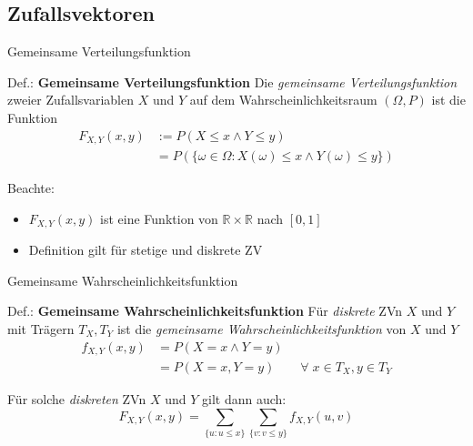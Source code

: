 \documentclass[
  10pt,
  ignorenonframetext,
]{beamer}
\providecommand{\tightlist}{%
  \setlength{\itemsep}{0pt}\setlength{\parskip}{0pt}}
\begin{document}
\subsection{Zufallsvektoren}\label{zufallsvektoren}

\begin{frame}{Gemeinsame Verteilungsfunktion}
\label{gemeinsame-verteilungsfunktion}
\begin{block}{Def.: \textbf{Gemeinsame Verteilungsfunktion}}
\label{def.-gemeinsame-verteilungsfunktion}
Die \emph{gemeinsame Verteilungsfunktion} zweier Zufallsvariablen \(X\)
und \(Y\) auf dem Wahrscheinlichkeitsraum \((\Omega, P)\) ist die
Funktion \begin{align*}
F_{X,Y}(x,y) &:=  P(X \leq x \land Y \leq y) \\
      &\phantom{}= P(\{\omega \in \Omega: X(\omega) \leq x \land Y(\omega) \leq y\})
\end{align*}
\end{block}

Beachte:

\begin{itemize}
\tightlist
\item
  \(F_{X,Y}(x, y)\) ist eine Funktion von
  \(\mathbb{R} \times \mathbb{R}\) nach \([0, 1]\)
\item
  Definition gilt für stetige und diskrete ZV
\end{itemize}
\end{frame}

\begin{frame}{Gemeinsame Wahrscheinlichkeitsfunktion}
\label{gemeinsame-wahrscheinlichkeitsfunktion}
\begin{block}{Def.: \textbf{Gemeinsame Wahrscheinlichkeitsfunktion}}
\label{def.-gemeinsame-wahrscheinlichkeitsfunktion}
Für \emph{diskrete} ZVn \(X\) und \(Y\) mit Trägern \(T_X,  T_Y\) ist
die \emph{gemeinsame Wahrscheinlichkeitsfunktion} von \(X\) und \(Y\)
\begin{align*}
f_{X,Y}(x,y) &= P(X = x \land Y = y) \\
             &= P(X = x, Y = y) \qquad \forall\; x \in T_X, y \in T_Y
\end{align*}
\end{block}

Für solche \emph{diskreten} ZVn \(X\) und \(Y\) gilt dann auch: \[
F_{X,Y}(x,y) = \sum_{ \{u: u \leq x \} } \sum_{\{v: v \leq y \} } f_{X,Y}(u,v) 
\]
\end{frame}
\end{document}
